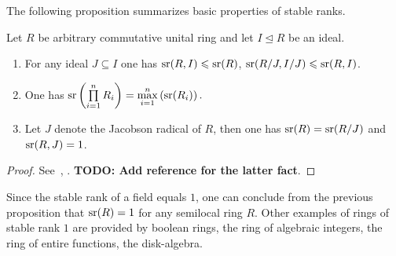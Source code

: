 The following proposition summarizes basic properties of stable ranks.
\begin{prop} \label{prop:sr_properties}
Let $R$ be arbitrary commutative unital ring and let $I\trianglelefteq R$ be an ideal.
\begin{enumerate}
\item For any ideal $J\subseteq I$ one has $\operatorname{sr}(R,I)\leqslant\operatorname{sr}(R)$, $\operatorname{sr}(R/J,I/J)\leqslant\operatorname{sr}(R,I)$.
\item One has $\operatorname{sr}\left(\prod\limits_{i=1}^n R_i\right)=\max\limits_{i=1}^n\left(\operatorname{sr}(R_i)\right).$
\item Let $J$ denote the Jacobson radical of $R$, then one has $\operatorname{sr}(R)=\operatorname{sr}(R/J)$ and $\operatorname{sr}(R, J) = 1$.
\end{enumerate}
\end{prop}
\begin{proof} See~\cite{Va71}, \cite[Theorem~2.3]{Va69}. 
\textbf{TODO: Add reference for the latter fact}.
\end{proof}
\begin{example}
Since the stable rank of a field equals $1$, one can conclude from the previous proposition that $\operatorname{sr}(R)=1$ for any semilocal ring $R$.
Other examples of rings of stable rank $1$ are provided by boolean rings, the ring of algebraic integers, the ring of entire functions, the disk-algebra.
\end{example}

